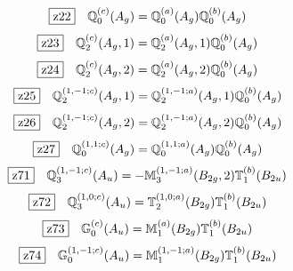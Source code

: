 \documentclass[fleqn,10pt,landscape]{jsarticle}
\begin{document}
\begin{dmath*}
\hspace*{3mm}\fbox{z22}\quad \mathbb{Q}_{0}^{(c)}(A_{g})=\mathbb{Q}_{0}^{(a)}(A_{g}) \mathbb{Q}_{0}^{(b)}(A_{g})
\end{dmath*}
\begin{dmath*}
\hspace*{3mm}\fbox{z23}\quad \mathbb{Q}_{2}^{(c)}(A_{g},1)=\mathbb{Q}_{2}^{(a)}(A_{g},1) \mathbb{Q}_{0}^{(b)}(A_{g})
\end{dmath*}
\begin{dmath*}
\hspace*{3mm}\fbox{z24}\quad \mathbb{Q}_{2}^{(c)}(A_{g},2)=\mathbb{Q}_{2}^{(a)}(A_{g},2) \mathbb{Q}_{0}^{(b)}(A_{g})
\end{dmath*}
\begin{dmath*}
\hspace*{3mm}\fbox{z25}\quad \mathbb{Q}_{2}^{(1,-1;c)}(A_{g},1)=\mathbb{Q}_{2}^{(1,-1;a)}(A_{g},1) \mathbb{Q}_{0}^{(b)}(A_{g})
\end{dmath*}
\begin{dmath*}
\hspace*{3mm}\fbox{z26}\quad \mathbb{Q}_{2}^{(1,-1;c)}(A_{g},2)=\mathbb{Q}_{2}^{(1,-1;a)}(A_{g},2) \mathbb{Q}_{0}^{(b)}(A_{g})
\end{dmath*}
\begin{dmath*}
\hspace*{3mm}\fbox{z27}\quad \mathbb{Q}_{0}^{(1,1;c)}(A_{g})=\mathbb{Q}_{0}^{(1,1;a)}(A_{g}) \mathbb{Q}_{0}^{(b)}(A_{g})
\end{dmath*}
\begin{dmath*}
\hspace*{3mm}\fbox{z71}\quad \mathbb{Q}_{3}^{(1,-1;c)}(A_{u})=- \mathbb{M}_{3}^{(1,-1;a)}(B_{2g},2) \mathbb{T}_{1}^{(b)}(B_{2u})
\end{dmath*}
\begin{dmath*}
\hspace*{3mm}\fbox{z72}\quad \mathbb{Q}_{3}^{(1,0;c)}(A_{u})=\mathbb{T}_{2}^{(1,0;a)}(B_{2g}) \mathbb{T}_{1}^{(b)}(B_{2u})
\end{dmath*}
\begin{dmath*}
\hspace*{3mm}\fbox{z73}\quad \mathbb{G}_{0}^{(c)}(A_{u})=\mathbb{M}_{1}^{(a)}(B_{2g}) \mathbb{T}_{1}^{(b)}(B_{2u})
\end{dmath*}
\begin{dmath*}
\hspace*{3mm}\fbox{z74}\quad \mathbb{G}_{0}^{(1,-1;c)}(A_{u})=\mathbb{M}_{1}^{(1,-1;a)}(B_{2g}) \mathbb{T}_{1}^{(b)}(B_{2u})
\end{dmath*}
\end{document}
